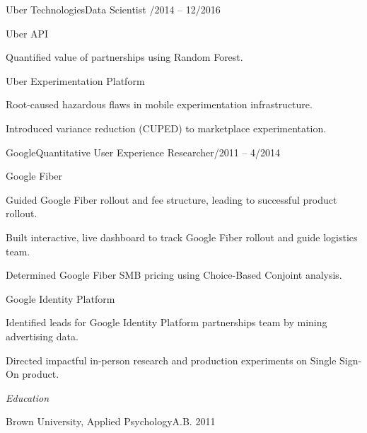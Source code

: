 \documentclass[12pt]{res}
\begin{document}
{\begin{resume}
\begin{list}{}{\leftmargin=1em}
{\begin{list}{}{\leftmargin=1em}
\item Uber Technologies\dotfill Data Scientist /2014 -- 12/2016
\begin{list}{}{\leftmargin=1em}
\item Uber API
\begin{list}{-}{\leftmargin=1em}
\item Quantified value of partnerships using Random Forest.
\end{list}
\item Uber Experimentation Platform
\begin{list}{-}{\leftmargin=1em}
\item Root-caused hazardous flaws in mobile experimentation infrastructure.
\item Introduced variance reduction (CUPED) to marketplace experimentation.
\end{list}
\end{list}
\vspace{4mm}
\item Google\dotfill Quantitative User Experience Researcher/2011 -- 4/2014
\begin{list}{}{\leftmargin=1em}
\item Google Fiber
\begin{list}{-}{\leftmargin=1em}
\item Guided Google Fiber rollout and fee structure, leading to successful product rollout.
\item Built interactive, live dashboard to track Google Fiber rollout and guide logistics team.
\item Determined Google Fiber SMB pricing using Choice-Based Conjoint analysis.
\end{list}
\item Google Identity Platform
\begin{list}{-}{\leftmargin=1em}
\item Identified leads for Google Identity Platform partnerships team by mining advertising data.
\item Directed impactful in-person research and production experiments on Single Sign-On product.
\end{list}
\end{list}
\end{list}}
\vspace{5mm}
\item{\textit{Education}
\vspace{6mm}
\begin{list}{}{\leftmargin=1em}
\item Brown University, Applied Psychology\dotfill A.B. 2011
\end{list}}
\end{list}
\end{resume}
} %
\end{document}
